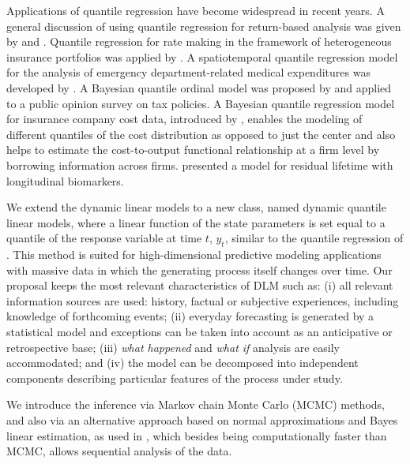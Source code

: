 \documentclass[12pt,a4paper]{article}\usepackage[]{graphicx}\usepackage[]{color}\usepackage{subfigure}
\begin{document}
  
 
Applications of quantile regression have become widespread in recent years. 
A general discussion of using quantile regression for return-based analysis was given by \cite{taylor1999quantile} and \cite{bassett2002portfolio}. 
Quantile regression for rate making in the framework of heterogeneous insurance portfolios was applied by \cite{kudryavtsev2009using}. 
A spatiotemporal quantile regression model for the analysis of emergency department-related medical expenditures was developed by \cite{neelon2015spatiotemporal}. 
A Bayesian quantile ordinal model was proposed by \cite{rahman2016bayesian} and applied to a public opinion survey on tax policies. %
A Bayesian quantile regression model for insurance company cost data, introduced by \cite{sriram2016bayesian}, enables the modeling of different quantiles of the cost distribution as opposed to just the center and also helps to estimate the cost-to-output functional relationship at a firm level by borrowing information across firms. 
\cite{li2016quantile} presented a model for residual lifetime with longitudinal biomarkers. 

 

We extend the dynamic linear models to a new class, named dynamic quantile linear models, where a linear function of the state parameters is set equal to a quantile of the response variable at time $t$, $y_t$, similar to the quantile regression of \cite{Koenker2005}. 
This method is suited for high-dimensional predictive modeling applications with massive data in which the generating process itself changes over time. 
Our proposal keeps the most relevant characteristics of DLM such as: 
(i) all relevant information sources are used:  history, factual or subjective experiences, including knowledge of forthcoming events;
(ii) everyday forecasting is generated  by a statistical model and exceptions can be taken into account as an anticipative or retrospective base;
(iii) {\it what happened} and {\it what if} analysis are easily accommodated; 
and (iv) the model can be decomposed into independent components describing particular features of the process under study.  

We introduce the inference via Markov chain Monte Carlo (MCMC) methods, and also via an alternative approach based on normal approximations and Bayes linear estimation, as used in \cite{west1985dynamic}, which besides being computationally faster than MCMC, allows sequential analysis of the data.
\end{document}

